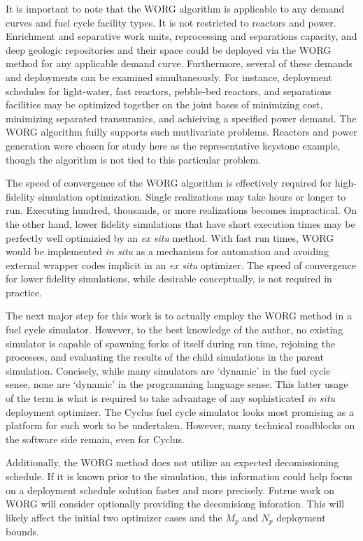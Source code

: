 It is important to note that the WORG algorithm is applicable to any
demand curves and fuel cycle facility types. It is not restricted to
reactors and power. Enrichment and separative work units, reprocessing
and separations capacity, and deep geologic repositories and their
space could be deployed via the WORG method for any applicable demand
curve. Furthermore, several of these demands and deployments can be
examined simultaneously. For instance, deployment schedules for light-water,
fast reactors, pebble-bed reactors, and separations facilities may be optimized
together on the joint
bases of minimizing cost, minimizing separated transuranics, and achieiving
a specified power demand. The WORG algorithm fuilly supports such mutlivariate
problems. Reactors and power generation were chosen for study here as the
representative keystone example, though the algorithm is not tied to this
particular problem.

The speed of convergence of the WORG algorithm is effectively required for
high-fidelity simulation optimization. Single realizations may take hours or
longer to run. Executing hundred, thousands, or more realizations becomes
impractical. On the other hand, lower fidelity simulations that have short
execution times may be perfectly well optimizied by an \emph{ex situ}
method. With fast run times, WORG would be implemented \emph{in situ} as
a mechanism for automation and avoiding external wrapper codes implicit
in an \emph{ex situ} optimizer. The speed of convergence for lower fidelity
simulations, while desirable conceptually, is not required in practice.

The next major step for this work is to actually employ the WORG method in
a fuel cycle simulator.  However, to the best knowledge of the
author, no existing simulator is capable of spawning forks of itself
during run time, rejoining the processes, and evaluating the results of the
child simulations in the parent simulation. Concisely, while many simulators
are `dynamic' in the fuel cycle sense, none are `dynamic' in the programming
language sense. This latter usage of the term is what is required to
take advantage of any sophisticated \emph{in situ} deployment optimizer.
The Cyclus fuel cycle simulator looks most promising as a platform
for such work to be undertaken. However, many technical roadblocks
on the software side remain, even for Cyclus.

Additionally, the WORG method does not utilize an expected decomissioning
schedule. If it is known prior to the simulation, this information
could help focus on a deployment schedule solution faster and more precisely.
Futrue work on WORG will consider optionally providing the decomisiong inforation.
This will likely affect the initial two optimizer cases and the
$M_p$ and $N_p$ deployment bounds.

